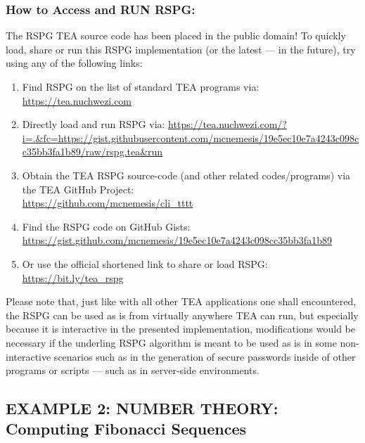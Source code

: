 \documentclass[a4paper, 18pt]{book} %
\begin{document}
{{{\vspace{2em}

\subsubsection{How to Access and RUN RSPG:}

\vspace{1em}

The RSPG TEA source code has been placed in the public domain! To quickly load, share or run this RSPG implementation (or the latest --- in the future), try using any of the following links:

\vspace{2em}

\begin{enumerate}
\item Find RSPG on the list of standard TEA programs via:\\ \url{https://tea.nuchwezi.com}
\item Directly load and run RSPG via: {\normalsize \url{https://tea.nuchwezi.com/?i=.&fc=https://gist.githubusercontent.com/mcnemesis/19e5ec10e7a4243c098cc35bb3fa1b89/raw/rspg.tea&run} }
\item{Obtain the TEA RSPG source-code (and other related codes/programs) via the TEA GitHub Project:\\
\url{https://github.com/mcnemesis/cli_tttt}}
\item{ Find the RSPG code on GitHub Gists:\\
\url{https://gist.github.com/mcnemesis/19e5ec10e7a4243c098cc35bb3fa1b89}}
\item{ Or use the official shortened link to share or load RSPG:\\
 \url{https://bit.ly/tea_rspg}
 }
\end{enumerate}

\vspace{2em}

Please note that, just like with all other TEA applications one shall encountered, the RSPG can be used as is from virtually anywhere TEA can run, but especially because it is interactive in the presented implementation, modifications would be necessary if the underling RSPG algorithm is meant to be used as is in some non-interactive scenarios such as in the generation of secure passwords inside of other programs or scripts --- such as in server-side environments.


\subsection{EXAMPLE 2: \textbf{NUMBER THEORY:} Computing Fibonacci Sequences}
\label{SECVEXAMP2}


}}}
\end{document}
